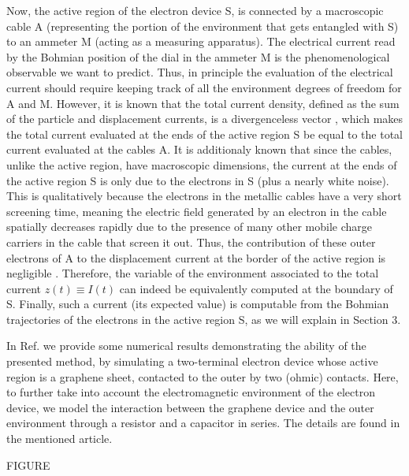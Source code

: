 \documentclass[11pt, a4paper]{article} %
\begin{document}
Now, the active region of the electron device S, is connected by a macroscopic cable A (representing the portion of the environment that gets entangled with S) to an ammeter M (acting as a measuring apparatus). The electrical current read by the Bohmian position of the dial in the ammeter M is the phenomenological observable we want to predict. Thus, in principle the evaluation of the electrical current should require keeping track of all the environment degrees of freedom for A and M. However, it is known that the total current density, defined as the sum of the particle and displacement currents, is a divergenceless vector \cite{diver1, diver2}, which makes the total current evaluated at the ends of the active region S be equal to the total current evaluated at the cables A. It is additionaly known \cite{equiv} that since the cables, unlike the active region, have macroscopic dimensions, the current at the ends of the active region S is only due to the electrons in S (plus a nearly white noise). This is qualitatively because the electrons in the metallic cables have a very short screening time, meaning the electric field generated by an electron in the cable spatially decreases rapidly due to the presence of many other mobile charge carriers in the cable that screen it out. Thus, the contribution of these outer electrons of A to the displacement current at the border of the active region is negligible \cite{neg}. Therefore, the variable of the environment associated to the total current $z(t)\equiv I(t)$ can indeed be equivalently computed at the boundary of S. Finally, such a current (its expected value) is computable from the Bohmian trajectories of the electrons in the active region S, as we will explain in Section 3. 

In Ref. \cite{Thz} we provide some numerical results demonstrating the ability of the presented method, by simulating a two-terminal electron device whose active region is a graphene sheet, contacted to the outer by two (ohmic) contacts. Here, to further take into account the electromagnetic environment of the electron device, we model the interaction between the graphene device and the outer environment through a resistor and a capacitor in series. The details are found in the mentioned article. 

\vspace{1cm}
\begin{center}
FIGURE
\end{center}

\newpage
\end{document}

